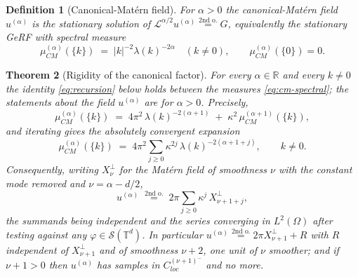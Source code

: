 \documentclass[pdflatex,sn-mathphys,Numbered]{sn-jnl}
\theoremstyle{thmstyleone}%
\newtheorem{theorem}{Theorem}[section]%
\theoremstyle{thmstyletwo}%
\theoremstyle{thmstylethree}%
\newtheorem{definition}[theorem]{Definition}%
\newcommand{\RR}{\mathbb{R}}
\newcommand{\TT}{\mathbb{T}}
\newcommand{\calL}{\mathcal{L}}
\newcommand{\calS}{\mathcal{S}}
\newcommand{\eqso}{\stackrel{\text{2nd o.}}{=}}
\begin{document}
\begin{definition}[Canonical-Mat\'ern field]\label{def:can-mat}
For $\alpha > 0$ the canonical-Mat\'ern field $u^{(\alpha)}$ is the stationary
solution of $\calL^{\alpha/2}u^{(\alpha)} \eqso G$, equivalently the stationary
GeRF with spectral measure
\begin{equation}\label{eq:cm-spectral}
    \mu^{(\alpha)}_{CM}(\{k\}) \;=\; |k|^{-2}\lambda(k)^{-2\alpha}
    \quad (k \neq 0), \qquad \mu^{(\alpha)}_{CM}(\{0\}) = 0 .
\end{equation}
\end{definition}

\begin{theorem}[Rigidity of the canonical factor]\label{thm:rigidity}
For every $\alpha \in \RR$ and every $k \neq 0$ the identity \eqref{eq:recursion}
below holds between the measures \eqref{eq:cm-spectral}; the statements about the
field $u^{(\alpha)}$ are for $\alpha>0$. Precisely,
\begin{equation}\label{eq:recursion}
    \mu^{(\alpha)}_{CM}(\{k\})
    \;=\; 4\pi^2\,\lambda(k)^{-2(\alpha+1)}
        \;+\; \kappa^2\,\mu^{(\alpha+1)}_{CM}(\{k\}) ,
\end{equation}
and iterating gives the absolutely convergent expansion
\begin{equation}\label{eq:expansion}
    \mu^{(\alpha)}_{CM}(\{k\})
    \;=\; 4\pi^2 \sum_{j \geq 0} \kappa^{2j}\, \lambda(k)^{-2(\alpha+1+j)} ,
    \qquad k \neq 0 .
\end{equation}
Consequently, writing $X^{\perp}_{\nu}$ for the Mat\'ern field of smoothness
$\nu$ with the constant mode removed and $\nu = \alpha - d/2$,
\begin{equation}\label{eq:decomposition}
    u^{(\alpha)} \;\eqso\; 2\pi\sum_{j\geq0} \kappa^{j}\,X^{\perp}_{\nu+1+j} ,
\end{equation}
the summands being independent and the series converging in $L^2(\Omega)$ after
testing against any $\varphi \in \calS(\TT^d)$. In particular
$u^{(\alpha)} \eqso 2\pi X^{\perp}_{\nu+1} + R$ with $R$ independent of
$X^\perp_{\nu+1}$ and of smoothness $\nu+2$, one unit of $\nu$ smoother; and if
$\nu + 1 > 0$ then
$u^{(\alpha)}$ has samples in $C^{(\nu+1)^-}_{loc}$ and no more.
\end{theorem}
\end{document}
